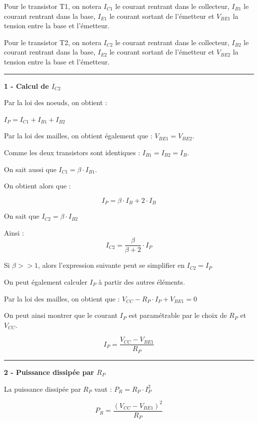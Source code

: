 \documentclass[a4paper,french]{paper}
\begin{document}
Pour le transistor T1, on notera $I_{C1}$ le courant rentrant dans le collecteur, $I_{B1}$ le courant rentrant dans la base, $I_{E1}$ le courant sortant de l'émetteur et $V_{BE1}$ la tension entre la base et l'émetteur.

Pour le transistor T2, on notera $I_{C2}$ le courant rentrant dans le collecteur, $I_{B2}$ le courant rentrant dans la base, $I_{E2}$ le courant sortant de l'émetteur et $V_{BE2}$ la tension entre la base et l'émetteur.

\medskip

\rule{\linewidth}{.5pt}

\textbf{1 - Calcul de $I_{C2}$}

Par la loi des noeuds, on obtient : 

$I_P =  I_{C1} + I_{B1} + I_{B2}$

Par la loi des mailles, on obtient également que : $V_{BE1} = V_{BE2}$.

Comme les deux transistors sont identiques : $I_{B1} = I_{B2} = I_{B}$.

On sait aussi que $I_{C1} = \beta \cdot I_{B1}$.


\medskip

On obtient alors que :

$$\boxed{I_P =  \beta \cdot I_{B} + 2 \cdot I_{B}}$$

\medskip

On sait que $I_{C2} = \beta \cdot I_{B2}$ 

Ainsi : $$\boxed{I_{C2} =  \frac{\beta}{\beta + 2} \cdot I_{P}}$$


Si $\beta >> 1$, alors l'expression suivante peut se simplifier en $I_{C2} = I_{P}$

\medskip

On peut également calculer $I_P$ à partir des autres éléments.

Par la loi des mailles, on obtient que : $V_{CC} - R_P \cdot I_P + V_{BE1} = 0$

On peut ainsi montrer que le courant $I_P$ est paramétrable par le choix de $R_P$ et $V_{CC}$. 

$$\boxed{I_{P} =  \frac{V_{CC} - V_{BE1}}{R_P}}$$


\medskip

\rule{\linewidth}{.5pt}

\textbf{2 - Puissance dissipée par $R_P$}

La puissance dissipée par $R_P$ vaut : $P_R = R_P \cdot I_P^2$

$$\boxed{P_{R} =  \frac{(V_{CC} - V_{BE1})^2}{R_P}}$$
\end{document}

